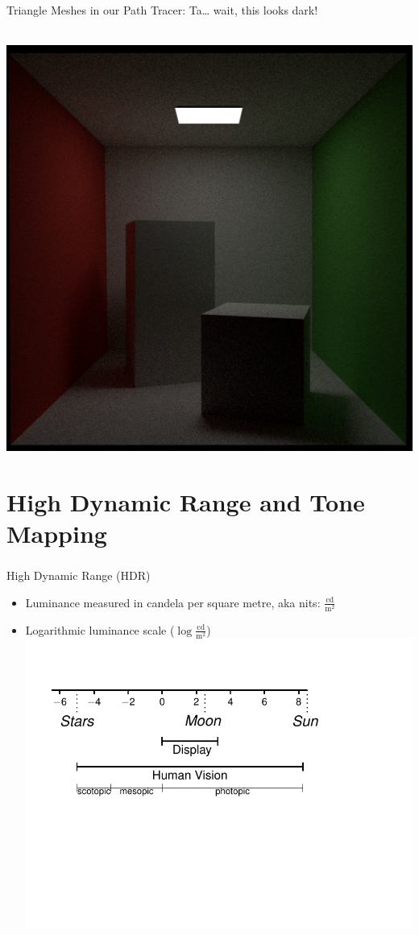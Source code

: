 \documentclass[utf8,stillsansserifmath,fleqn,t]{beamer}
\begin{document}
\begin{frame}[label=triangle-mesh-2]
\frametitle{\insertsection}
Triangle Meshes in our Path Tracer: Ta\ldots{} wait, this looks dark!\\~\\
\centerline{\includegraphics[width=.55\textwidth]{./fig/pathtracer-result-05-1.png}}
\end{frame}

\section{High Dynamic Range and Tone Mapping}

\begin{frame}[label=hdr-0]
\frametitle{\insertsection}
High Dynamic Range (HDR)
\begin{itemize}
\item Luminance measured in candela per square metre, aka nits: $\frac{\text{cd}}{\text{m}^2}$
\item Logarithmic luminance scale ($\log \frac{\text{cd}}{\text{m}^2}$)\\[2ex]
\includegraphics[width=.9\textwidth]{./fig/log-luminance.pdf}
\end{itemize}
\end{frame}
\end{document}
